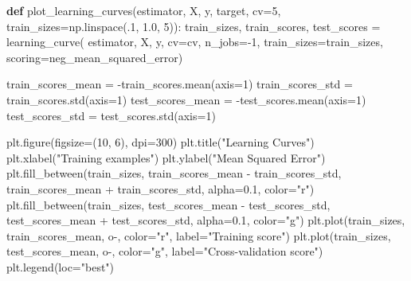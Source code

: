 \documentclass[
  letterpaper,
  DIV=11,
  numbers=noendperiod]{scrartcl}
\newenvironment{Shaded}{\begin{snugshade}}{\end{snugshade}}
\newcommand{\DecValTok}[1]{\textcolor[rgb]{0.68,0.00,0.00}{#1}}
\newcommand{\FloatTok}[1]{\textcolor[rgb]{0.68,0.00,0.00}{#1}}
\newcommand{\KeywordTok}[1]{\textcolor[rgb]{0.00,0.23,0.31}{\textbf{#1}}}
\newcommand{\NormalTok}[1]{\textcolor[rgb]{0.00,0.23,0.31}{#1}}
\newcommand{\OperatorTok}[1]{\textcolor[rgb]{0.37,0.37,0.37}{#1}}
\newcommand{\StringTok}[1]{\textcolor[rgb]{0.13,0.47,0.30}{#1}}
\begin{document}
\begin{Shaded}
\begin{Highlighting}[]
\KeywordTok{def}\NormalTok{ plot\_learning\_curves(estimator, X, y, target, cv}\OperatorTok{=}\DecValTok{5}\NormalTok{, train\_sizes}\OperatorTok{=}\NormalTok{np.linspace(}\FloatTok{.1}\NormalTok{, }\FloatTok{1.0}\NormalTok{, }\DecValTok{5}\NormalTok{)):}
\NormalTok{    train\_sizes, train\_scores, test\_scores }\OperatorTok{=}\NormalTok{ learning\_curve(}
\NormalTok{        estimator, X, y, cv}\OperatorTok{=}\NormalTok{cv, n\_jobs}\OperatorTok{={-}}\DecValTok{1}\NormalTok{, train\_sizes}\OperatorTok{=}\NormalTok{train\_sizes,}
\NormalTok{        scoring}\OperatorTok{=}\StringTok{\textquotesingle{}neg\_mean\_squared\_error\textquotesingle{}}\NormalTok{)}
    
\NormalTok{    train\_scores\_mean }\OperatorTok{=} \OperatorTok{{-}}\NormalTok{train\_scores.mean(axis}\OperatorTok{=}\DecValTok{1}\NormalTok{)}
\NormalTok{    train\_scores\_std }\OperatorTok{=}\NormalTok{ train\_scores.std(axis}\OperatorTok{=}\DecValTok{1}\NormalTok{)}
\NormalTok{    test\_scores\_mean }\OperatorTok{=} \OperatorTok{{-}}\NormalTok{test\_scores.mean(axis}\OperatorTok{=}\DecValTok{1}\NormalTok{)}
\NormalTok{    test\_scores\_std }\OperatorTok{=}\NormalTok{ test\_scores.std(axis}\OperatorTok{=}\DecValTok{1}\NormalTok{)}

\NormalTok{    plt.figure(figsize}\OperatorTok{=}\NormalTok{(}\DecValTok{10}\NormalTok{, }\DecValTok{6}\NormalTok{), dpi}\OperatorTok{=}\DecValTok{300}\NormalTok{)}
\NormalTok{    plt.title(}\StringTok{"Learning Curves"}\NormalTok{)}
\NormalTok{    plt.xlabel(}\StringTok{"Training examples"}\NormalTok{)}
\NormalTok{    plt.ylabel(}\StringTok{"Mean Squared Error"}\NormalTok{)}
\NormalTok{    plt.fill\_between(train\_sizes, train\_scores\_mean }\OperatorTok{{-}}\NormalTok{ train\_scores\_std,}
\NormalTok{                     train\_scores\_mean }\OperatorTok{+}\NormalTok{ train\_scores\_std, alpha}\OperatorTok{=}\FloatTok{0.1}\NormalTok{, color}\OperatorTok{=}\StringTok{"r"}\NormalTok{)}
\NormalTok{    plt.fill\_between(train\_sizes, test\_scores\_mean }\OperatorTok{{-}}\NormalTok{ test\_scores\_std,}
\NormalTok{                     test\_scores\_mean }\OperatorTok{+}\NormalTok{ test\_scores\_std, alpha}\OperatorTok{=}\FloatTok{0.1}\NormalTok{, color}\OperatorTok{=}\StringTok{"g"}\NormalTok{)}
\NormalTok{    plt.plot(train\_sizes, train\_scores\_mean, }\StringTok{\textquotesingle{}o{-}\textquotesingle{}}\NormalTok{, color}\OperatorTok{=}\StringTok{"r"}\NormalTok{, label}\OperatorTok{=}\StringTok{"Training score"}\NormalTok{)}
\NormalTok{    plt.plot(train\_sizes, test\_scores\_mean, }\StringTok{\textquotesingle{}o{-}\textquotesingle{}}\NormalTok{, color}\OperatorTok{=}\StringTok{"g"}\NormalTok{, label}\OperatorTok{=}\StringTok{"Cross{-}validation score"}\NormalTok{)}
\NormalTok{    plt.legend(loc}\OperatorTok{=}\StringTok{"best"}\NormalTok{)}


\end{Highlighting}
\end{Shaded}
\end{document}
